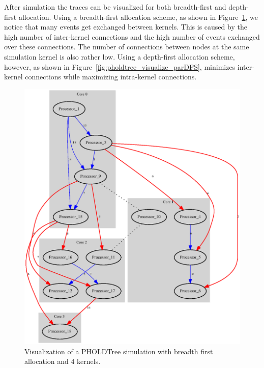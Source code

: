 After simulation the traces can be visualized for both breadth-first and depth-first allocation.
Using a breadth-first allocation scheme, as shown in Figure~\ref{fig:pholdtree_visualize_parBFS}, we notice that many events get exchanged between kernels.
This is caused by the high number of inter-kernel connections and the high number of events exchanged over these connections.
The number of connections between nodes at the same simulation kernel is also rather low.
Using a depth-first allocation scheme, however, as shown in Figure~\ref{fig:pholdtree_visualize_parDFS}, minimizes inter-kernel connections while maximizing intra-kernel connections.

\begin{figure}
    \center
    \includegraphics[width=\columnwidth]{fig/pholdtreed1n3t5000c4BFS.eps}
    \caption{Visualization of a PHOLDTree simulation with breadth first allocation and 4 kernels.}
    \label{fig:pholdtree_visualize_parBFS}
\end{figure}
